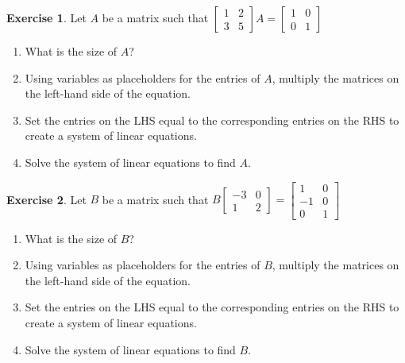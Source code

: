 \documentclass[handout]{beamer}
\newcommand{\fn}{\insertframenumber}
\theoremstyle{definition}
\newtheorem{exercise}{Exercise}
\begin{document}
\begin{frame}{\fn}
	\begin{exercise}
		Let $A$ be a matrix such that 
		$\begin{bmatrix}
		1&2\\3&5
		\end{bmatrix}A=
		\begin{bmatrix}
		1&0\\0&1
		\end{bmatrix}$
		\begin{enumerate}[label=(\alph*)]
			\item What is the size of $A$?\pause
			\item Using variables as placeholders for the entries of $A$, multiply the matrices on the left-hand side of the equation.\pause
			\item Set the entries on the LHS equal to the corresponding entries on the RHS to create a system of linear equations.\pause
			\item Solve the system of linear equations to find $A$.
		\end{enumerate}
	\end{exercise}
\end{frame}


\begin{frame}{\fn}
	\begin{exercise}
		Let $B$ be a matrix such that 
		$B\begin{bmatrix}
		-3&0\\1&2
		\end{bmatrix}=
		\begin{bmatrix}
		1&0\\-1&0\\0&1
		\end{bmatrix}$
		\begin{enumerate}[label=(\alph*)]
			\item What is the size of $B$?\pause
			\item Using variables as placeholders for the entries of $B$, multiply the matrices on the left-hand side of the equation.\pause
			\item Set the entries on the LHS equal to the corresponding entries on the RHS to create a system of linear equations.\pause
			\item Solve the system of linear equations to find $B$.
		\end{enumerate}
	\end{exercise}
\end{frame}
\end{document}
